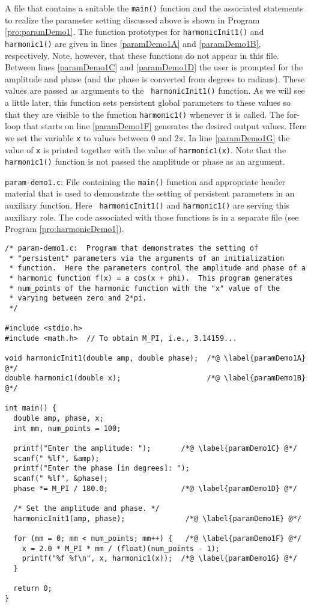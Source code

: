 A file that contains a suitable the {\tt main()} function and the
associated statements to realize the parameter setting discussed above
is shown in Program \ref{pro:paramDemo1}.  The function prototypes for
{\tt harmonicInit1()} and {\tt harmonic1()} are given in lines
\ref{paramDemo1A} and \ref{paramDemo1B}, respectively.  Note, however,
that these functions do not appear in this file.  Between lines
\ref{paramDemo1C} and \ref{paramDemo1D} the user is prompted for the
amplitude and phase (and the phase is converted from degrees to
radians).  These values are passed as arguments to the {\tt
  harmonicInit1()} function.  As we will see a little later, this
function sets persistent global parameters to these values so that
they are visible to the function {\tt harmonic1()} whenever it is
called.  The for-loop that starts on line \ref{paramDemo1F} generates
the desired output values.  Here we set the variable {\tt x} to values
between $0$ and $2\pi$.  In line \ref{paramDemo1G} the value of {\tt x}
is printed together with the value of {\tt harmonic1(x)}.  Note that
the {\tt harmonic1()} function is not passed the amplitude or phase as
an argument.

\begin{program}
{\tt param-demo1.c}: File containing the {\tt main()} function and
appropriate header material that is used to demonstrate the setting of
persistent parameters in an auxiliary function.  Here {\tt
  harmonicInit1()} and {\tt harmonic1()} are serving this auxiliary
role.  The code associated with those functions is in a separate
file (see Program \ref{pro:harmonicDemo1}).
\label{pro:paramDemo1}
\codemiddle
\begin{lstlisting}
/* param-demo1.c:  Program that demonstrates the setting of
 * "persistent" parameters via the arguments of an initialization
 * function.  Here the parameters control the amplitude and phase of a
 * harmonic function f(x) = a cos(x + phi).  This program generates
 * num_points of the harmonic function with the "x" value of the
 * varying between zero and 2*pi.
 */

#include <stdio.h>
#include <math.h>  // To obtain M_PI, i.e., 3.14159...

void harmonicInit1(double amp, double phase);  /*@ \label{paramDemo1A} @*/
double harmonic1(double x);                    /*@ \label{paramDemo1B} @*/

int main() {
  double amp, phase, x;
  int mm, num_points = 100;

  printf("Enter the amplitude: ");       /*@ \label{paramDemo1C} @*/
  scanf(" %lf", &amp);
  printf("Enter the phase [in degrees]: ");
  scanf(" %lf", &phase);
  phase *= M_PI / 180.0;                 /*@ \label{paramDemo1D} @*/

  /* Set the amplitude and phase. */
  harmonicInit1(amp, phase);              /*@ \label{paramDemo1E} @*/

  for (mm = 0; mm < num_points; mm++) {   /*@ \label{paramDemo1F} @*/
    x = 2.0 * M_PI * mm / (float)(num_points - 1);
    printf("%f %f\n", x, harmonic1(x));  /*@ \label{paramDemo1G} @*/
  }

  return 0;
}
\end{lstlisting}
\end{program}

